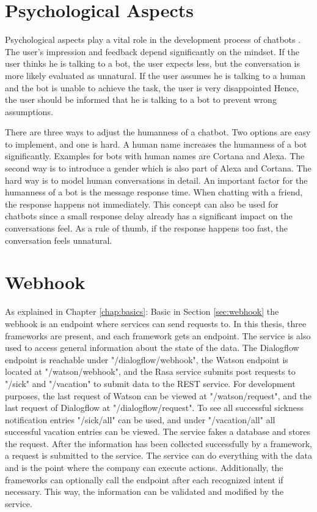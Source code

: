 \section{Psychological Aspects}
Psychological aspects play a vital role in the development process of chatbots \citet{brandtzaeg2018chatbots}.
The user's impression and feedback depend significantly on the mindset.
If the user thinks he is talking to a bot, the user expects less, but the conversation is more likely evaluated as unnatural.
If the user assumes he is talking to a human and the bot is unable to achieve the task, the user is very disappointed
Hence, the user should be informed that he is talking to a bot to prevent wrong assumptions.

There are three ways to adjust the humanness of a chatbot.
Two options are easy to implement, and one is hard.
A human name increases the humanness of a bot significantly.
Examples for bots with human names are Cortana and Alexa.
The second way is to introduce a gender which is also part of Alexa and Cortana.
The hard way is to model human conversations in detail.
An important factor for the humanness of a bot is the message response time.
When chatting with a friend, the response happens not immediately.
This concept can also be used for chatbots since a small response delay already has a significant impact on the conversations feel.
As a rule of thumb, if the response happens too fast, the conversation feels unnatural.

\section{Webhook}
As explained in Chapter \ref{chap:basics}: Basic in Section \ref{sec:webhook} the webhook is an endpoint where services can send requests to.
In this thesis, three frameworks are present, and each framework gets an endpoint.
The service is also used to access general information about the state of the data.
The Dialogflow endpoint is reachable under "/dialogflow/webhook",
the Watson endpoint is located at "/watson/webhook", and the Rasa service submits post requests to "/sick" and "/vacation" to submit data to the REST service.
For development purposes, the last request of Watson can be viewed at "/watson/request", and the last request of Dialogflow at "/dialogflow/request".
To see all successful sickness notification entries "/sick/all" can be used, and under "/vacation/all" all successful vacation entries can be viewed.
The service fakes a database and stores the request.
After the information has been collected successfully by a framework, a request is submitted to the service.
The service can do everything with the data and is the point where the company can execute actions.
Additionally, the frameworks can optionally call the endpoint after each recognized intent if necessary.
This way, the information can be validated and modified by the service.

